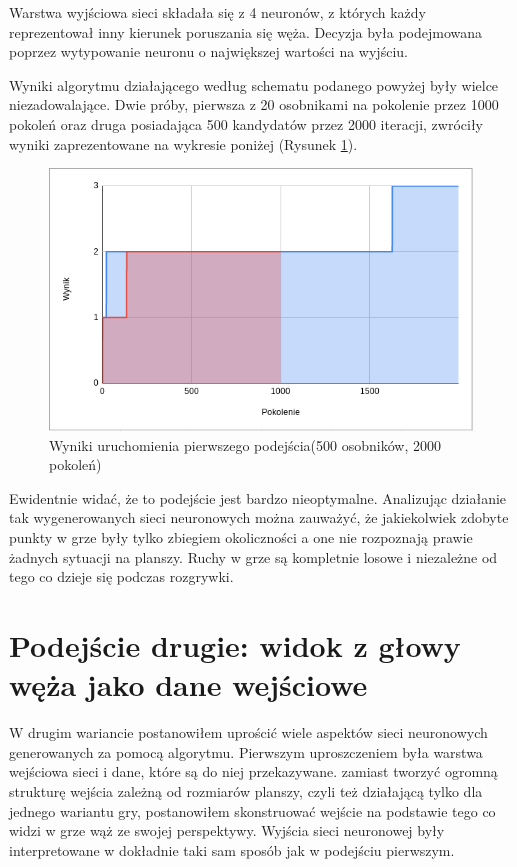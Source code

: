 \documentclass[12pt, oneside, a4paper]{report}
\begin{document}
Warstwa wyjściowa sieci składała się z 4 neuronów, z których każdy reprezentował inny kierunek poruszania się węża. Decyzja była podejmowana poprzez wytypowanie neuronu o największej wartości na wyjściu.

Wyniki algorytmu działającego według schematu podanego powyżej były wielce niezadowalające. Dwie próby, pierwsza z 20 osobnikami na pokolenie przez 1000 pokoleń oraz druga posiadająca 500 kandydatów przez 2000 iteracji, zwróciły wyniki zaprezentowane na wykresie poniżej (Rysunek \ref{fig: 4.4.2.2}).

\begin{figure}[h]
	\centering
	\includegraphics[width=13cm]{fig42.png}
	\caption{Wyniki uruchomienia pierwszego podejścia(500 osobników, 2000 pokoleń) }
	\label{fig: 4.4.2.2}
\end{figure}

Ewidentnie widać, że to podejście jest bardzo nieoptymalne. Analizując działanie tak wygenerowanych sieci neuronowych można zauważyć, że jakiekolwiek zdobyte punkty w grze były tylko zbiegiem okoliczności a one nie rozpoznają prawie żadnych sytuacji na planszy. Ruchy w grze są kompletnie losowe i niezależne od tego co dzieje się podczas rozgrywki.

\section{Podejście drugie: widok z głowy węża jako dane wejściowe}

W drugim wariancie postanowiłem uprościć wiele aspektów sieci neuronowych generowanych za pomocą algorytmu. Pierwszym uproszczeniem była warstwa wejściowa sieci i dane, które są do niej przekazywane. zamiast tworzyć ogromną strukturę wejścia zależną od rozmiarów planszy, czyli też działającą tylko dla jednego wariantu gry, postanowiłem skonstruować wejście na podstawie tego co widzi w grze wąż ze swojej perspektywy. Wyjścia sieci neuronowej były interpretowane w dokładnie taki sam sposób jak w podejściu pierwszym.
\end{document}
